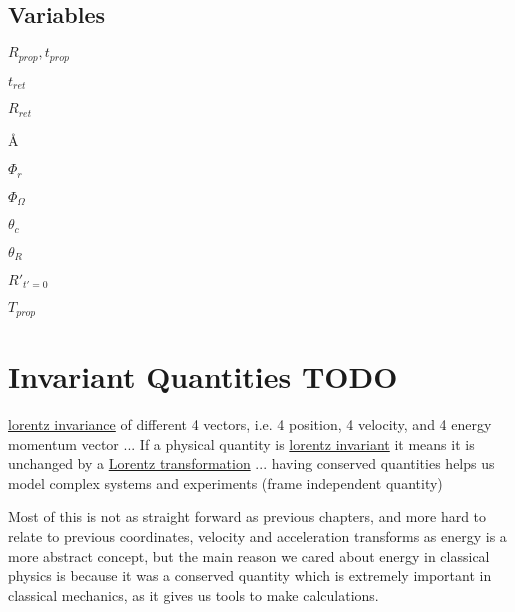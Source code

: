 \section{Variables}

$R_{prop}, t_{prop}$ \newline

$t_{ret}$ \newline

$R_{ret}$ \newline

\AA  \newline

$\Phi_r$ \newline

$\Phi_{\Omega}$ \newline

$\theta_c$ \newline

$\theta_R$ \newline

$R'_{t'=0}$ \newline

$T_{prop}$ \newline



\chapter{Invariant Quantities TODO}
\hyperlink{def-lorentz-invariant}{lorentz invariance} of different 4 vectors, i.e. 4 position, 4 velocity, and 4 energy momentum vector
... If a physical quantity is \hyperlink{def-lorentz-invariant}{lorentz invariant} it means it is unchanged by a \hyperlink{def-lorentz-transform}{Lorentz transformation} 
... having conserved quantities helps us model complex systems and experiments (frame independent quantity)


Most of this is not as straight forward as previous chapters, and more hard to relate to previous coordinates, velocity and acceleration transforms as energy is a more abstract concept, but the main reason we cared about energy in classical physics is because it was a conserved quantity which is extremely important in classical mechanics, as it gives us tools to make calculations.

